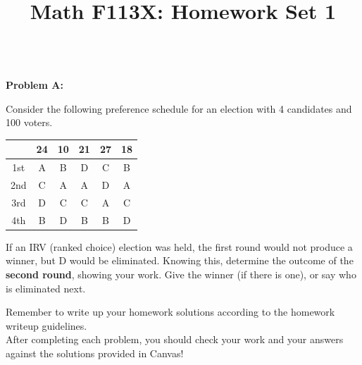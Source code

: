 \documentclass[11pt, oneside]{article}   	%
\title{Math F113X: Homework Set 1}
\date{}							%
\begin{document}
\maketitle


 \\

{\bf Problem A:}

Consider the following preference schedule for an election with 4 candidates and 100 voters.

\begin{center}
\begin{tabular}{c||c|c|c|c|c|}
&24&10&21&27&18\\
\hline\hline
1st&A&B&D&C&B\\
2nd&C&A&A&D&A\\
3rd&D&C&C&A&C\\
4th&B&D&B&B&D
\end{tabular}
\end{center}

If an IRV (ranked choice) election was held, the first round
would not produce a winner, but D would be eliminated. Knowing this,
determine the outcome of the {\bf second round}, showing your
work. Give the winner (if there is one), or say who is eliminated
next. \\

\vspace{1cm}

Remember to write up your homework solutions according to the homework writeup guidelines. \\

After completing each problem, you should check your work and your answers against the solutions provided in Canvas!\\
\end{document}
